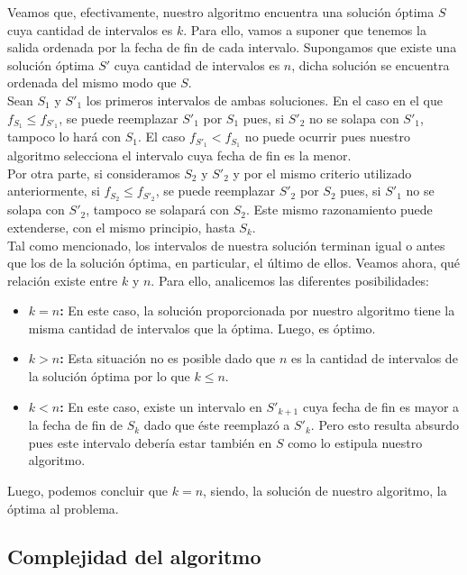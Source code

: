Veamos que, efectivamente, nuestro algoritmo encuentra una solución óptima $S$ cuya cantidad de intervalos es $k$. Para ello, vamos a suponer que tenemos la salida ordenada por la fecha de fin de cada intervalo. Supongamos que existe una solución óptima $S'$ cuya cantidad de intervalos es $n$, dicha solución se encuentra ordenada del mismo modo que $S$.\\
\newline
Sean $S_{1}$ y $S'_{1}$ los primeros intervalos de ambas soluciones. En el caso en el que $f_{S_{1}} \leq f_{S'_{1}}$, se puede reemplazar $S'_{1}$ por $S_{1}$ pues, si $S'_{2}$ no se solapa con $S'_{1}$, tampoco lo hará con $S_{1}$. El caso $f_{S'_{1}} < f_{S_{1}}$ no puede ocurrir pues nuestro algoritmo selecciona el intervalo cuya fecha de fin es la menor.\\
\newline
Por otra parte, si consideramos $S_{2}$ y $S'_{2}$ y por el mismo criterio utilizado anteriormente, si $f_{S_{2}} \leq f_{S'_{2}}$, se puede reemplazar $S'_{2}$ por $S_{2}$ pues, si $S'_{1}$ no se solapa con $S'_{2}$, tampoco se solapará con $S_{2}$. Este mismo razonamiento puede extenderse, con el mismo principio, hasta $S_{k}$.\\
\newline
Tal como mencionado, los intervalos de nuestra solución terminan igual o antes que los de la solución óptima, en particular, el último de ellos. Veamos ahora, qué relación existe entre $k$ y $n$. Para ello, analicemos las diferentes posibilidades:
\begin{itemize}
\item \textbf{$k = n$:} En este caso, la solución proporcionada por nuestro algoritmo tiene la misma cantidad de intervalos que la óptima. Luego, es óptimo.
\item \textbf{$k > n$:} Esta situación no es posible dado que $n$ es la cantidad de intervalos de la solución óptima por lo que $k \leq n$.
\item \textbf{$k < n$:} En este caso, existe un intervalo en $S'_{k+1}$ cuya fecha de fin es mayor a la fecha de fin de $S_{k}$ dado que éste reemplazó a $S'_{k}$. Pero esto resulta absurdo pues este intervalo debería estar también en $S$ como lo estipula nuestro algoritmo.
\end{itemize}

Luego, podemos concluir que $k = n$, siendo, la solución de nuestro algoritmo, la óptima al problema. 

\subsection{Complejidad del algoritmo}

